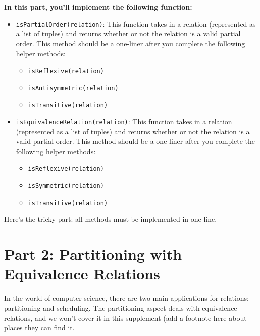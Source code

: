 \documentclass{article}
\begin{document}

    \vspace{3mm}
    \textbf{In this part, you'll implement the following function:}
    \begin{tcolorbox}[colback=blue!10]
        \begin{itemize}
            \item \lstinline{isPartialOrder(relation)}: This function takes in a relation (represented as a list of tuples) and returns whether or not the relation is a valid partial order. This method should be a one-liner after you complete the following helper methods:
            \begin{itemize}
                \item \lstinline{isReflexive(relation)}
                \item \lstinline{isAntisymmetric(relation)}
                \item \lstinline{isTransitive(relation)}
            \end{itemize}
            \item \lstinline{isEquivalenceRelation(relation)}: This function takes in a relation (represented as a list of tuples) and returns whether or not the relation is a valid partial order. This method should be a one-liner after you complete the following helper methods:
            \begin{itemize}
                \item \lstinline{isReflexive(relation)}
                \item \lstinline{isSymmetric(relation)}
                \item \lstinline{isTransitive(relation)}
            \end{itemize}
        \end{itemize}
        Here's the tricky part: all methods must be implemented in one line.
    \end{tcolorbox}



\section*{Part 2: Partitioning with Equivalence Relations}
    In the world of computer science, there are two main applications for relations: partitioning and scheduling. The partitioning aspect deals with equivalence relations, and we won't cover it in this supplement (add a footnote here about places they can find it. 
\end{document}
